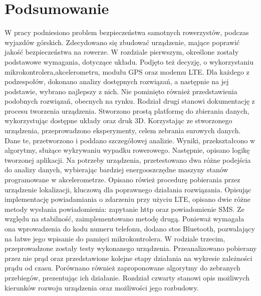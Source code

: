 \chapter{Podsumowanie}
W pracy podniesiono problem bezpieczeństwa samotnych rowerzystów, podczas wyjazdów górskich. Zdecydowano się zbudować urządzenie, mające poprawić jakość bezpieczeństwa na rowerze. W rozdziale pierwszym, określone zostały podstawowe wymagania, dotyczące układu. Podjęto też decyzję, o wykorzystaniu mikrokontrolera,akcelerometru, modułu GPS oraz modemu LTE. Dla każdego z podzespołów, dokonano analizy dostępnych rozwiązań, a następnie na jej podstawie, wybrano najlepszy z nich. Nie pominięto również przedstawienia podobnych rozwiązań, obecnych na rynku. Rodział drugi stanowi dokumentację z procesu tworzenia urządzenia. Stworzono prostą platformę do zbierania danych, wykorzystując dostępne układy oraz druk 3D. Korzystając ze stworzonego urządzenia, przeprowadzono eksperymenty, celem zebrania surowych danych. Dane te, przetworzono i poddano szczegółowej analizie. Wyniki, przekształcono w algorytmy, służące wykrywaniu wypadku rowerowego. Następnie, opisano logikę tworzonej aplikacji. Na potrzeby urządzenia, przetestowano dwa różne podejścia do analizy danych, wybierając bardziej energooszczędne maszyny stanów programowane w akcelerometrze. Opisano rówież procedurę pobierania przez urządzenie lokalizacji, kluczową dla poprawnego działania rozwiązania. Opisując implementację powiadamiania o zdarzeniu przy użyciu LTE, opisano dwie różne metody wysłania powiadomienia: zapytanie http oraz powiadomienie SMS. Ze względu na stabilność, zaimplementowano metodę drugą. Ponieważ wymagała ona wprowadzenia do kodu numeru telefonu, dodano stos Bluetooth, pozwalający na łatwe jego wpisanie do pamięci mikrokontrolera. W rodziale trzecim, przeprowadzone zostały testy wykonanego urządzenia. Przeanalizowano pobierany przez nie prąd oraz przedstawione kolejne etapy działania na wykresie zależności prądu od czasu. Porównano również zaproponowane algorytmy do zebranych przebiegów, prezentując ich działanie. Rozdział czwarty stanowi opis możliwych kierunków rozwoju urządzenia oraz możliwości jego rozbudowy.